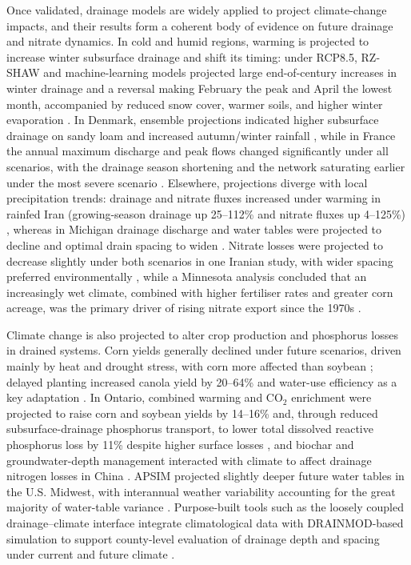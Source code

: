 \documentclass[11pt]{article}
\begin{document}
Once validated, drainage models are widely applied to project climate-change impacts, and their results form a coherent body of evidence on future drainage and nitrate dynamics. In cold and humid regions, warming is projected to increase winter subsurface drainage and shift its timing: under RCP8.5, RZ-SHAW and machine-learning models projected large end-of-century increases in winter drainage and a reversal making February the peak and April the lowest month, accompanied by reduced snow cover, warmer soils, and higher winter evaporation \parencite{Li2025}. In Denmark, ensemble projections indicated higher subsurface drainage on sandy loam and increased autumn/winter rainfall \parencite{Rasmussen2018}, while in France the annual maximum discharge and peak flows changed significantly under all scenarios, with the drainage season shortening and the network saturating earlier under the most severe scenario \parencite{Jeantet2022}. Elsewhere, projections diverge with local precipitation trends: drainage and nitrate fluxes increased under warming in rainfed Iran (growing-season drainage up 25--112\% and nitrate fluxes up 4--125\%) \parencite{Haghnazari2020}, whereas in Michigan drainage discharge and water tables were projected to decline and optimal drain spacing to widen \parencite{Dialameh2025}. Nitrate losses were projected to decrease slightly under both scenarios in one Iranian study, with wider spacing preferred environmentally \parencite{Ziaeifar2025}, while a Minnesota analysis concluded that an increasingly wet climate, combined with higher fertiliser rates and greater corn acreage, was the primary driver of rising nitrate export since the 1970s \parencite{Nangia2010b}.

Climate change is also projected to alter crop production and phosphorus losses in drained systems. Corn yields generally declined under future scenarios, driven mainly by heat and drought stress, with corn more affected than soybean \parencite{Adhikari2020,Dialameh2025,Kanber2019}; delayed planting increased canola yield by 20--64\% and water-use efficiency as a key adaptation \parencite{Asgari2022}. In Ontario, combined warming and CO$_2$ enrichment were projected to raise corn and soybean yields by 14--16\% and, through reduced subsurface-drainage phosphorus transport, to lower total dissolved reactive phosphorus loss by 11\% despite higher surface losses \parencite{Wang2021}, and biochar and groundwater-depth management interacted with climate to affect drainage nitrogen losses in China \parencite{Zhang2022b}. APSIM projected slightly deeper future water tables in the U.S. Midwest, with interannual weather variability accounting for the great majority of water-table variance \parencite{Elli2023}. Purpose-built tools such as the loosely coupled drainage--climate interface integrate climatological data with DRAINMOD-based simulation to support county-level evaluation of drainage depth and spacing under current and future climate \parencite{Adhikari2020}.

\printbibliography
\end{document}

